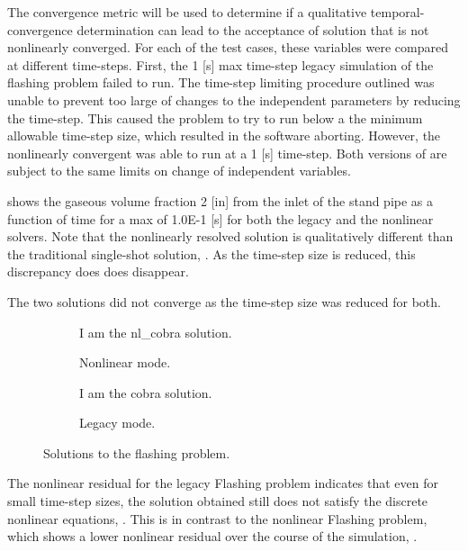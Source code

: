 
The convergence metric will be used to determine if a qualitative temporal-convergence determination can lead to the acceptance of solution that is not nonlinearly converged.
For each of the test cases, these variables were compared at different time-steps.
First, the 1 [s] max time-step legacy simulation of the flashing problem failed to run.
The time-step limiting procedure outlined  was unable to prevent too large of changes to the independent parameters by reducing the time-step.
This caused the problem to try to run below a the minimum allowable time-step size, which resulted in the software aborting.
However, the nonlinearly convergent \cobra{} was able to run at a 1 [s] time-step.
Both versions of \cobra{} are subject to the same limits on change of independent variables.

 shows the gaseous volume fraction 2 [in] from the inlet of the stand pipe as a function of time for a max \dt{} of 1.0E-1 [s] for both the legacy and the nonlinear solvers.
Note that the nonlinearly resolved solution is qualitatively different than the traditional single-shot solution, .
As the time-step size is reduced, this discrepancy does does disappear.

The two solutions did not converge as the time-step size was reduced for both.

\begin{figure}
        \centering
        \begin{subfigure}[b]{0.48\textwidth}
                \centering
				I am the nl\_cobra solution.
                \caption{Nonlinear mode.}
                \label{fig:gull}
        \end{subfigure}%
        \begin{subfigure}[b]{0.48\textwidth}
                \centering
				I am the cobra solution.
                \caption{Legacy mode.}
                \label{fig:tiger}
        \end{subfigure}
        \caption{Solutions to the flashing problem.}
        \label{fig:flashing_solution}
\end{figure}

The nonlinear residual for the legacy Flashing problem indicates that even for small time-step sizes, the solution obtained still does not satisfy the discrete nonlinear equations, .
This is in contrast to the nonlinear Flashing problem, which shows a lower nonlinear residual over the course of the simulation, .

